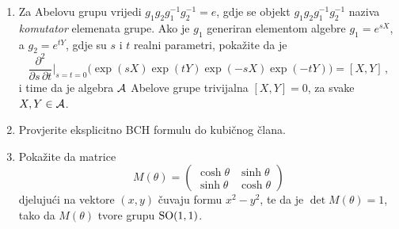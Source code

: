 \begin{enumerate}[label=\arabic{chapter}.\arabic*.]
\item \label{zad:abelovaalgebra} Za Abelovu grupu vrijedi $g_1 g_2 g_{1}^{-1} g_{2}^{-1} = e$,
    gdje se objekt $g_1 g_2 g_{1}^{-1} g_{2}^{-1}$ naziva \emph{komutator} elemenata grupe.
    Ako je $g_1$ generiran elementom algebre $g_1 = e^{s X}$, a $g_2 = e^{t Y}$, gdje su
    $s$ i $t$ realni parametri, pokažite da je
\begin{equation}
\frac{\partial^2}{\partial s \, \partial t} \bigg|_{s=t=0} \big( \exp(sX) \exp(tY)
\exp(-sX) \exp(-tY) \big) = [X, Y] \,,
\end{equation}
i time da je algebra $\mathcal{A}$ Abelove grupe trivijalna $[X, Y] = 0$, za svake $X, Y \in \mathcal{A}$.

\item Provjerite eksplicitno BCH formulu do kubičnog člana.


\item Pokažite da matrice
\begin{equation}
 M(\theta) = \begin{pmatrix}
\cosh\theta & \sinh\theta  \\
\sinh\theta & \cosh\theta
\end{pmatrix}
\end{equation}
djelujući na vektore $(x, y)$ čuvaju formu $x^2 - y^2$, te da 
je $\det M(\theta) = 1$, tako da $M(\theta)$ tvore grupu
$\mathrm{SO}(1,1)$.
\end{enumerate}
